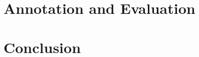 \documentclass[twoside]{ctuthesis}
\theoremstyle{plain}
\theoremstyle{definition}
\theoremstyle{note}
\begin{document}
 

\chapter{Annotation and Evaluation}




\chapter{Conclusion}

\appendix

\printindex

 

\end{document}
